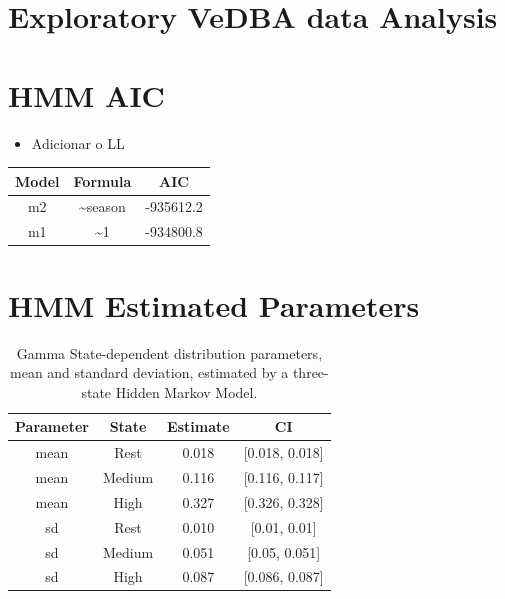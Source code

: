 \documentclass[english,msc,numbers,hidelinks]{coppe}
\providecommand{\tightlist}{%
  \setlength{\itemsep}{0pt}\setlength{\parskip}{0pt}}
\begin{document}
  \hypertarget{exploratory-vedba-data-analysis}{%
  \chapter{Exploratory VeDBA data Analysis}\label{exploratory-vedba-data-analysis}}

  \hypertarget{hmm-aic}{%
  \chapter{HMM AIC}\label{hmm-aic}}
  \begin{itemize}
  \tightlist
  \item
    Adicionar o LL
  \end{itemize}
  \begin{table}[!h]
  \centering
  \begin{tabular}{ccc}
  \toprule
  Model & Formula & AIC\\
  \midrule
  m2 & \textasciitilde{}season & -935612.2\\
  m1 & \textasciitilde{}1 & -934800.8\\
  \bottomrule
  \end{tabular}
  \end{table}
  \hypertarget{hmm-estimated-parameters}{%
  \chapter{HMM Estimated Parameters}\label{hmm-estimated-parameters}}
  \begin{table}[!h]

  \caption{\label{tab:appendix-parameters}Gamma State-dependent distribution parameters, mean and standard deviation, estimated by a three-state Hidden Markov Model.}
  \centering
  \begin{tabular}[t]{cccc}
  \toprule
  Parameter & State & Estimate & CI\\
  \midrule
  mean & Rest & 0.018 & {}[0.018, 0.018]\\
  mean & Medium & 0.116 & {}[0.116, 0.117]\\
  mean & High & 0.327 & {}[0.326, 0.328]\\
  sd & Rest & 0.010 & {}[0.01, 0.01]\\
  sd & Medium & 0.051 & {}[0.05, 0.051]\\
  \addlinespace
  sd & High & 0.087 & {}[0.086, 0.087]\\
  \bottomrule
  \end{tabular}
  \end{table}
\end{document}
